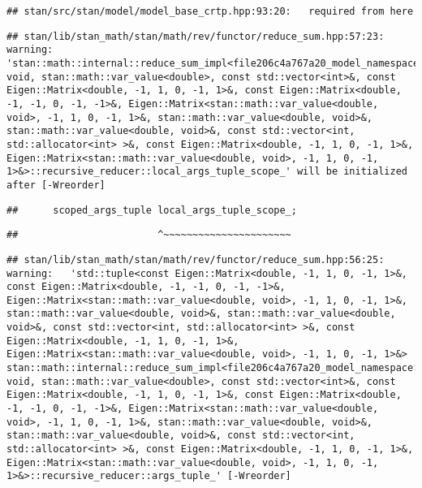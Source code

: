 \documentclass[
]{article}
\begin{document}
\begin{verbatim}
## stan/src/stan/model/model_base_crtp.hpp:93:20:   required from here
\end{verbatim}

\begin{verbatim}
## stan/lib/stan_math/stan/math/rev/functor/reduce_sum.hpp:57:23: warning: 'stan::math::internal::reduce_sum_impl<file206c4a767a20_model_namespace::partial_log_lik_rsfunctor__, void, stan::math::var_value<double>, const std::vector<int>&, const Eigen::Matrix<double, -1, 1, 0, -1, 1>&, const Eigen::Matrix<double, -1, -1, 0, -1, -1>&, Eigen::Matrix<stan::math::var_value<double, void>, -1, 1, 0, -1, 1>&, stan::math::var_value<double, void>&, stan::math::var_value<double, void>&, const std::vector<int, std::allocator<int> >&, const Eigen::Matrix<double, -1, 1, 0, -1, 1>&, Eigen::Matrix<stan::math::var_value<double, void>, -1, 1, 0, -1, 1>&>::recursive_reducer::local_args_tuple_scope_' will be initialized after [-Wreorder]
\end{verbatim}

\begin{verbatim}
##      scoped_args_tuple local_args_tuple_scope_;
\end{verbatim}

\begin{verbatim}
##                        ^~~~~~~~~~~~~~~~~~~~~~~
\end{verbatim}

\begin{verbatim}
## stan/lib/stan_math/stan/math/rev/functor/reduce_sum.hpp:56:25: warning:   'std::tuple<const Eigen::Matrix<double, -1, 1, 0, -1, 1>&, const Eigen::Matrix<double, -1, -1, 0, -1, -1>&, Eigen::Matrix<stan::math::var_value<double, void>, -1, 1, 0, -1, 1>&, stan::math::var_value<double, void>&, stan::math::var_value<double, void>&, const std::vector<int, std::allocator<int> >&, const Eigen::Matrix<double, -1, 1, 0, -1, 1>&, Eigen::Matrix<stan::math::var_value<double, void>, -1, 1, 0, -1, 1>&> stan::math::internal::reduce_sum_impl<file206c4a767a20_model_namespace::partial_log_lik_rsfunctor__, void, stan::math::var_value<double>, const std::vector<int>&, const Eigen::Matrix<double, -1, 1, 0, -1, 1>&, const Eigen::Matrix<double, -1, -1, 0, -1, -1>&, Eigen::Matrix<stan::math::var_value<double, void>, -1, 1, 0, -1, 1>&, stan::math::var_value<double, void>&, stan::math::var_value<double, void>&, const std::vector<int, std::allocator<int> >&, const Eigen::Matrix<double, -1, 1, 0, -1, 1>&, Eigen::Matrix<stan::math::var_value<double, void>, -1, 1, 0, -1, 1>&>::recursive_reducer::args_tuple_' [-Wreorder]
\end{verbatim}
\end{document}
